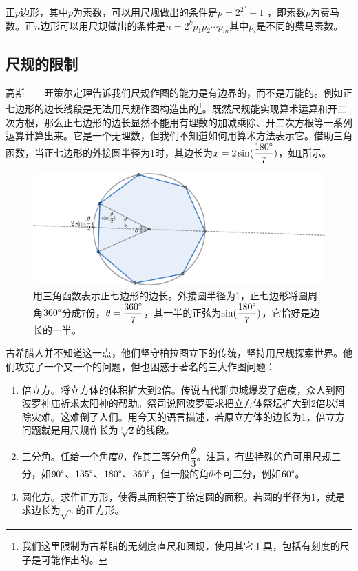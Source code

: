 \documentclass[b5paper]{ctexart}
\begin{document}
\begin{theorem}[高斯——旺策尔]
正$p$边形，其中$p$为素数，可以用尺规做出的条件是$p=2^{2^n} + 1$ ，即素数$p$为费马数。正$n$边形可以用尺规做出的条件是$n=2^k p_1 p_2 \dotsm p_m$其中$p_i$是不同的费马素数\cite{Edward-1977}。
\end{theorem}

\subsection{尺规的限制}
高斯——旺策尔定理告诉我们尺规作图的能力是有边界的，而不是万能的。例如正七边形的边长线段是无法用尺规作图构造出的\footnote{我们这里限制为古希腊的无刻度直尺和圆规，使用其它工具，包括有刻度的尺子是可能作出的。}。既然尺规能实现算术运算和开二次方根，那么正七边形的边长显然不能用有理数的加减乘除、开二次方根等一系列运算计算出来。它是一个无理数，但我们不知道如何用算术方法表示它。借助三角函数，当正七边形的外接圆半径为1时，其边长为$x = 2\sin(\dfrac{180\degree}{7})$，如\cref{fig:heptagon}所示。

\begin{figure}[htbp]
 \centering
 \includegraphics[scale=0.35]{img/heptagon}
 \caption{用三角函数表示正七边形的边长。外接圆半径为1，正七边形将圆周角$360\degree$分成7份，$\theta = \dfrac{360\degree}{7}$，其一半的正弦为$\sin(\dfrac{180\degree}{7})$，它恰好是边长的一半。}
 \label{fig:heptagon}
\end{figure}

古希腊人并不知道这一点，他们坚守柏拉图立下的传统，坚持用尺规探索世界。他们攻克了一个又一个的问题，但也困惑于著名的三大作图问题：

\begin{enumerate}[(1)]
\item 倍立方。将立方体的体积扩大到2倍。传说古代雅典城爆发了瘟疫，众人到阿波罗神庙祈求太阳神的帮助。祭司说阿波罗要求把立方体祭坛扩大到2倍以消除灾难。这难倒了人们。用今天的语言描述，若原立方体的边长为1，倍立方问题就是用尺规作长为$\sqrt[3]{2}$的线段。

\item 三分角。任给一个角度$\theta$，作其三等分角$\dfrac{\theta}{3}$。注意，有些特殊的角可用尺规三分，如$90\degree$、$135\degree$、$180\degree$、$360\degree$，但一般的角$\theta$不可三分，例如$60\degree$。

\item 圆化方。求作正方形，使得其面积等于给定圆的面积。若圆的半径为1，就是求边长为$\sqrt{\pi}$的正方形。
\end{enumerate}
\end{document}

